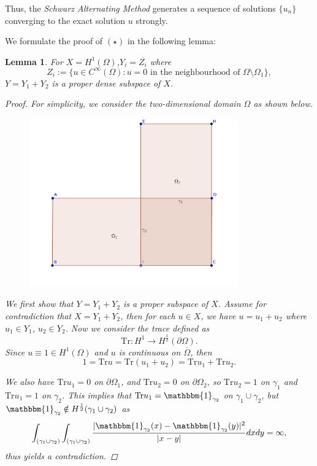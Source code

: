 \documentclass[11pt, a4paper]{amsart}
\newtheorem{lemma}[theorem]{Lemma}
\begin{document}
Thus, the \emph{Schwarz Alternating Method} generates a sequence of solutions $\{u_n\}$ converging to the exact solution $u$ strongly.
\par
We formulate the proof of $(\star)$ in the following lemma:
\begin{lemma}
For $X=H^1(\Omega)$,$Y_i=\overline{Z_i}$ where $$Z_i:=\{u\in C^{\infty}(\Omega)\colon u=0 \mbox{ in the neighbourhood of } \Omega\setminus\Omega_1\},$$ 
$Y=Y_1+Y_2$ is a proper dense subspace of $X$.
\begin{proof}
For simplicity, we consider the two-dimensional domain $\Omega$ as shown below.
\begin{figure}[h]
\includegraphics[width=90mm,scale=0.2]
{lshapedomain.png}
\end{figure}
We first show that $Y=Y_1+Y_2$ is a proper subspace of $X$. Assume for contradiction that $X=Y_1+Y_2$, then for each $u\in X$, we have $u=u_1+u_2$ where $u_1\in Y_1$, $u_2\in Y_2$. Now we consider the trace defined as
$$\mathrm{Tr}\colon H^{1} \to H^{\frac{1}{2}}(\partial \Omega).$$
Since $u\equiv 1\in H^1(\Omega)$ and $u$ is continuous on $\overline{\Omega}$, then 
$$1=\mathrm{Tr}u=\mathrm{Tr}(u_1+u_2)=\mathrm{Tr}u_1+\mathrm{Tr}u_2.$$

We also have $\mathrm{Tr}u_1=0$ on $\partial\Omega_1$, and $\mathrm{Tr}u_2=0$ on $\partial\Omega_2$, so $\mathrm{Tr}u_2=1$ on $\gamma_1$ and $\mathrm{Tr}u_1=1$ on $\gamma_2$. This implies that $\mathrm{Tr}u_1=\mathbbm{1}_{\gamma_2}$ on $\gamma_1\cup\gamma_2$, but $\mathbbm{1}_{\gamma_2}\notin H^{\frac{1}{2}}(\gamma_1\cup\gamma_2)$ as
$$\int_{(\gamma_1\cup\gamma_2)}\int_{(\gamma_1\cup\gamma_2)}\frac{|\mathbbm{1}_{\gamma_2}(x)-\mathbbm{1}_{\gamma_2}(y)|^2}{|x-y|} dx dy=\infty,$$
thus yields a contradiction.


\end{proof}
\end{lemma}
\end{document}
